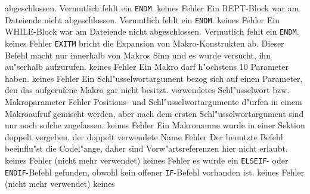 \documentclass[12pt,a4paper,twoside]{report}
\newcommand{\tty}[1]{{\tt #1}}
\begin{document}
\begin{description}
{                abgeschlossen.  Vermutlich fehlt ein \tty{ENDM}.}
               {keines}
               {Fehler}
               {Ein REPT-Block war am Dateiende nicht
                abgeschlossen.  Vermutlich fehlt ein \tty{ENDM}.}
               {keines}
               {Fehler}
               {Ein WHILE-Block war am Dateiende nicht
                abgeschlossen.  Vermutlich fehlt ein \tty{ENDM}.}
               {keines}
               {Fehler}
               {\tty{EXITM} bricht die Expansion von
                Makro-Konstrukten ab.  Dieser Befehl macht nur innerhalb
                von Makros Sinn und es wurde versucht, ihn au"serhalb
                aufzurufen.}
               {keines}
               {Fehler}
               {Ein Makro darf h"ochstens 10 Parameter haben.}
               {keines}
               {Fehler}
               {Ein Schl"usselwortargument bezog sich auf einen
                Parameter, den das aufgerufene Makro gar nicht
                besitzt.}
               {verwendetes Schl"usselwort bzw. Makroparameter}
               {Fehler}
               {Positions- und Schl"usselwortargumente d"urfen in
                einem Makroaufruf gemischt werden, aber nach dem
                ersten Schl"usselwortargument sind nur noch
                solche zugelassen.}
               {keines}
               {Fehler}
               {Ein Makronamne wurde in einer Sektion doppelt
                vergeben.}
               {der doppelt verwendete Name}
               {Fehler}
               {Der benutzte Befehl beeinflu"st die Codel"ange,
                daher sind Vorw"artsreferenzen hier nicht erlaubt.}
               {keines}
               {Fehler}
               {(nicht mehr verwendet)}
               {keines}
               {Fehler}
               {es wurde ein \tty{ELSEIF}- oder \tty{ENDIF}-Befehl gefunden,
                obwohl kein offener \tty{IF}-Befehl vorhanden ist.}
               {keines}
               {Fehler}
               {(nicht mehr verwendet)}
               {keines}

\end{description}
\end{document}
